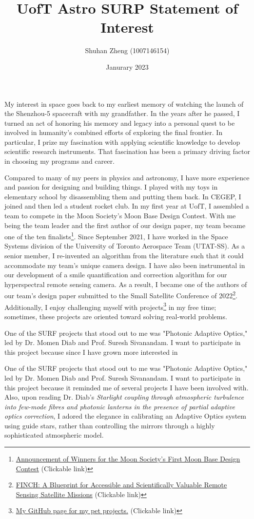 \documentclass{article}
\title{UofT Astro SURP Statement of Interest}
\author{Shuhan Zheng (1007146154)}
\date{Janurary 2023}
\begin{document}
\maketitle

My interest in space goes back to my earliest memory of watching the launch of the Shenzhou-5 spacecraft with my grandfather. In the years after he passed, I turned an act of honoring his memory and legacy into a personal quest to be involved in humanity's combined efforts of exploring the final frontier. In particular, I prize my fascination with applying scientific knowledge to develop scientific research instruments. That fascination has been a primary driving factor in choosing my programs and career. 

Compared to many of my peers in physics and astronomy, I have more experience and passion for designing and building things. I played with my toys in elementary school by disassembling them and putting them back. In CEGEP, I joined and then led a student rocket club. In my first year at UofT, I assembled a team to compete in the Moon Society's Moon Base Design Contest. With me being the team leader and the first author of our design paper, my team became one of the ten finalists\footnote{\href{https://www.moonsociety.org/news/2021/03/10/announcement-of-winners-for-the-moon-societys-first-moon-base-design-contest/}{Announcement of Winners for the Moon Society's First Moon Base Design Contest} (Clickable link)}. Since September 2021, I have worked in the Space Systems division of the University of Toronto Aerospace Team (UTAT-SS). As a senior member, I re-invented an algorithm from the literature such that it could accommodate my team's unique camera design. I have also been instrumental in our development of a smile quantification and correction algorithm for our hyperspectral remote sensing camera. As a result, I became one of the authors of our team's design paper submitted to the Small Satellite Conference of 2022\footnote{\href{https://digitalcommons.usu.edu/smallsat/2022/all2022/88/}{FINCH: A Blueprint for Accessible and Scientifically Valuable Remote Sensing Satellite Missions} (Clickable link)}. Additionally, I enjoy challenging myself with projects\footnote{\href{https://github.com/ThisisShoo/Pet-Projects}{My GitHub page for my pet projects.} (Clickable link)} in my free time; sometimes, these projects are oriented toward solving real-world problems. 

One of the SURF projects that stood out to me was "Photonic Adaptive Optics," led by Dr. Momen Diab and Prof. Suresh Sivanandam. I want to participate in this project because since I have grown more interested in 

One of the SURF projects that stood out to me was "Photonic Adaptive Optics," led by Dr. Momen Diab and Prof. Suresh Sivanandam. I want to participate in this project because it reminded me of several projects I have been involved with. Also, upon reading Dr. Diab's \textit{Starlight coupling through atmospheric turbulence into few-mode fibres and photonic lanterns in the presence of partial adaptive optics correction}, I adored the elegance in calibrating an Adaptive Optics system using guide stars, rather than controlling the mirrors through a highly sophisticated atmospheric model.
\end{document}

